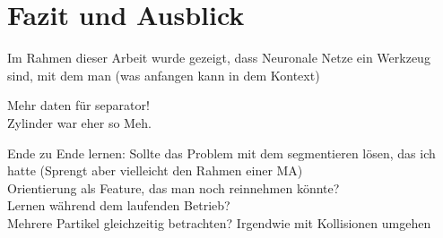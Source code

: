 \chapter{Fazit und Ausblick}


Im Rahmen dieser Arbeit wurde gezeigt, dass Neuronale Netze ein Werkzeug sind, mit dem man (was anfangen kann in dem Kontext)


Mehr daten für separator!\\
Zylinder war eher so Meh.



Ende zu Ende lernen: Sollte das Problem mit dem segmentieren lösen, das ich hatte
(Sprengt aber vielleicht den Rahmen einer MA)\\
Orientierung als Feature, das man noch reinnehmen könnte?\\
Lernen während dem laufenden Betrieb?\\
Mehrere Partikel gleichzeitig betrachten? Irgendwie mit Kollisionen umgehen